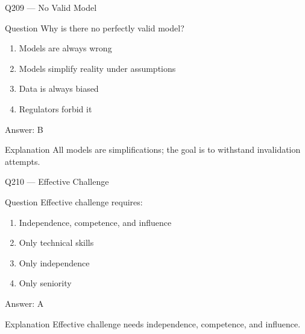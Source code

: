 \documentclass[aspectratio=169,8pt]{beamer}
\begin{document}
								\begin{frame}{Q209 --- No Valid Model}
									\begin{block}{Question}
										Why is there no perfectly valid model?
										\begin{enumerate}
											\item Models are always wrong
											\item Models simplify reality under assumptions
											\item Data is always biased
											\item Regulators forbid it
										\end{enumerate}
									\end{block}
									\begin{exampleblock}{Answer: B}\end{exampleblock}
									\begin{block}{Explanation}
										All models are simplifications; the goal is to withstand invalidation attempts.
									\end{block}
								\end{frame}
								
								\begin{frame}{Q210 --- Effective Challenge}
									\begin{block}{Question}
										Effective challenge requires:
										\begin{enumerate}
											\item Independence, competence, and influence
											\item Only technical skills
											\item Only independence
											\item Only seniority
										\end{enumerate}
									\end{block}
									\begin{exampleblock}{Answer: A}\end{exampleblock}
									\begin{block}{Explanation}
										Effective challenge needs independence, competence, and influence.
									\end{block}
								\end{frame}
								
\end{document}

